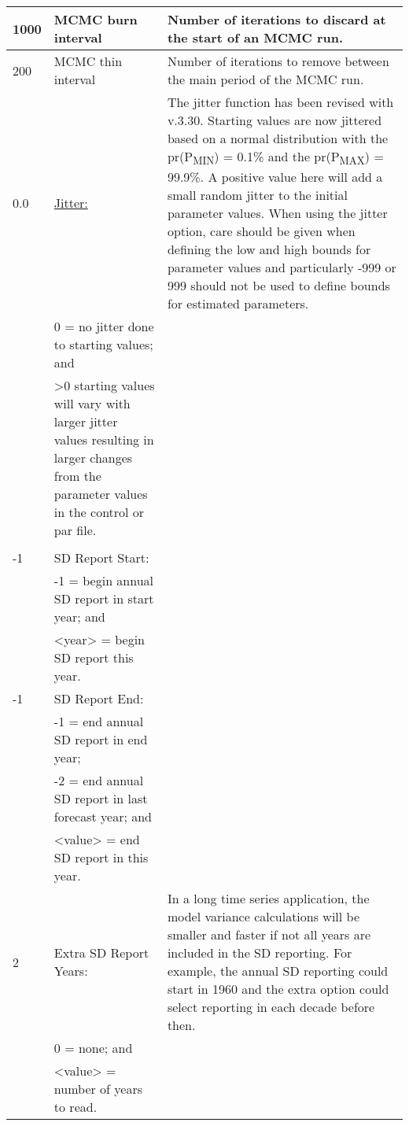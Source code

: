 {\begin{landscape}
\begin{longtable}{p{1.5cm} p{7.2cm} p{12.3cm}}
 \hline
 1000 & MCMC burn interval & Number of iterations to discard at the start of an MCMC run. \Tstrut\Bstrut\\
	   
 \hline
 200 & MCMC thin interval & Number of iterations to remove between the main period of the MCMC run. \Tstrut\\
	
 \pagebreak
 0.0 & \hyperlink{Jitter}{Jitter:} & \multirow{1}{1cm}[-0.25cm]{\parbox{12.5cm}{The jitter function has been revised with v.3.30. Starting values are now jittered based on a normal distribution with the pr(P\textsubscript{MIN}) = 0.1\% and the pr(P\textsubscript{MAX}) = 99.9\%. A positive value here will add a small random jitter to the initial parameter values. When using the jitter option, care should be given when defining the low and high bounds for parameter values and particularly -999 or 999 should not be used to define bounds for estimated parameters.}} \Tstrut\\ 
	 & 0 = no jitter done to starting values; and & \\
	 & >0 starting values will vary with larger jitter values resulting in larger changes from the parameter values in the control or par file. & \\
	 & & \\
	
 \hline
 -1 & SD Report Start: & \Tstrut\\
    & -1 = begin annual SD report in start year; and & \\
    & <year> = begin SD report this year. & \Bstrut\\
	      
 \hline
 -1 & SD Report End: & \Tstrut\\
    & -1 = end annual SD report in end year; & \\
    & -2 = end annual SD report in last forecast year; and & \\
    & <value> = end SD report in this year. & \Bstrut\\
	   
 \hline
 2 & Extra SD Report Years: & \multirow{1}{1cm}[-0.25cm]{\parbox{12.5cm}{In a long time series application, the model variance calculations will be smaller and faster if not all years are included in the SD reporting. For example, the annual SD reporting could start in 1960 and the extra option could select reporting in each decade before then.}} \Tstrut \Bstrut\\
   & 0 = none; and & \\
   & <value> = number of years to read. & \Bstrut\\


\end{longtable}
\end{landscape}}
